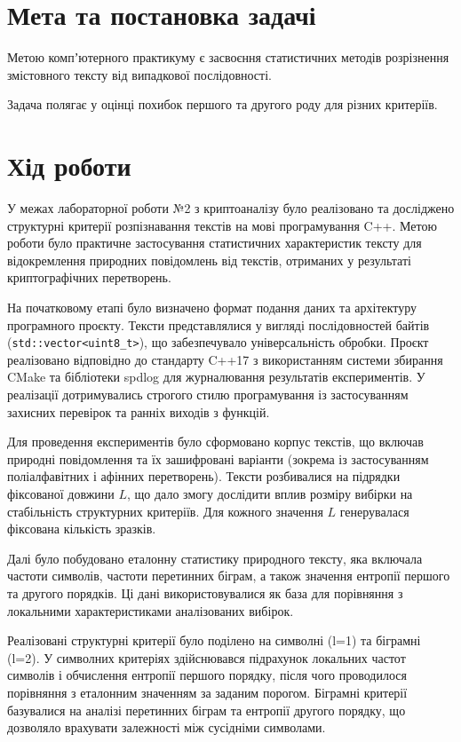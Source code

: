\documentclass{article}
\begin{document}


\section{Мета та постановка задачі}

Метою компʼютерного практикуму є засвоєння статистичних методів розрізнення змістовного тексту від випадкової послідовності.

Задача полягає у оцінці похибок першого та другого роду для різних критеріїв.

\section{Хід роботи}

У межах лабораторної роботи №2 з криптоаналізу було реалізовано та досліджено структурні критерії розпізнавання текстів на мові програмування C++. Метою роботи було практичне застосування статистичних характеристик тексту для відокремлення природних повідомлень від текстів, отриманих у результаті криптографічних перетворень.

На початковому етапі було визначено формат подання даних та архітектуру програмного проєкту. Тексти представлялися у вигляді послідовностей байтів (\texttt{std::vector<uint8\_t>}), що забезпечувало універсальність обробки. Проєкт реалізовано відповідно до стандарту C++17 з використанням системи збирання CMake та бібліотеки spdlog для журналювання результатів експериментів. У реалізації дотримувались строгого стилю програмування із застосуванням захисних перевірок та ранніх виходів з функцій.

Для проведення експериментів було сформовано корпус текстів, що включав природні повідомлення та їх зашифровані варіанти (зокрема із застосуванням поліалфавітних і афінних перетворень). Тексти розбивалися на підрядки фіксованої довжини \(L\), що дало змогу дослідити вплив розміру вибірки на стабільність структурних критеріїв. Для кожного значення \(L\) генерувалася фіксована кількість зразків.

Далі було побудовано еталонну статистику природного тексту, яка включала частоти символів, частоти перетинних біграм, а також значення ентропії першого та другого порядків. Ці дані використовувалися як база для порівняння з локальними характеристиками аналізованих вибірок.

Реалізовані структурні критерії було поділено на символні (l=1) та біграмні (l=2). 
У символних критеріях здійснювався підрахунок локальних частот символів і обчислення ентропії першого порядку, 
після чого проводилося порівняння з еталонним значенням за заданим порогом. Біграмні критерії базувалися на аналізі перетинних 
біграм та ентропії другого порядку, що дозволяло врахувати залежності між сусідніми символами.
\end{document}
